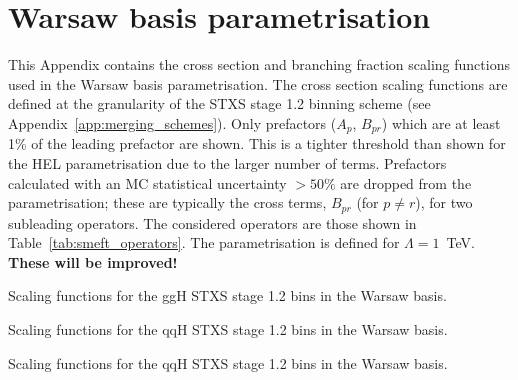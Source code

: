 \chapter{Warsaw basis parametrisation}\label{app:smeft_parametrisation}

This Appendix contains the cross section and branching fraction scaling functions used in the Warsaw basis parametrisation. The cross section scaling functions are defined at the granularity of the STXS stage 1.2 binning scheme (see Appendix~\ref{app:merging_schemes}). Only prefactors ($A_p$, $B_{pr}$) which are at least 1\% of the leading prefactor are shown. This is a tighter threshold than shown for the HEL parametrisation due to the larger number of terms. Prefactors calculated with an MC statistical uncertainty $>50\%$ are dropped from the parametrisation; these are typically the cross terms, $B_{pr}$ (for $p \neq r$), for two subleading operators. The considered operators are those shown in Table~\ref{tab:smeft_operators}. The parametrisation is defined for $\Lambda = 1$~TeV. \textbf{These will be improved!} 

\begin{table}[htb!]
  \centering
  \scriptsize
  \renewcommand{\arraystretch}{1.5}
  \setlength{\tabcolsep}{6pt}
  \caption[Warsaw: Scaling functions for the ggH STXS stage 1.2 bins]
  {
    Scaling functions for the ggH STXS stage 1.2 bins in the Warsaw basis.
  }
  \label{tab:warsaw_parametrisation_a}
  \hspace*{-2cm}
  
  \hspace*{-2cm}
\end{table}

\begin{table}[htb!]
  \centering
  \tiny
  \renewcommand{\arraystretch}{2}
  \setlength{\tabcolsep}{6pt}
  \caption[Warsaw: Scaling functions for the qqH STXS stage 1.2 bins]
  {
    Scaling functions for the qqH STXS stage 1.2 bins in the Warsaw basis.
  }
  \label{tab:warsaw_parametrisation_b}
  \hspace*{-2cm}
  
  \hspace*{-2cm}
\end{table}

\begin{table}[htb!]
  \centering
  \tiny
  \renewcommand{\arraystretch}{2}
  \setlength{\tabcolsep}{6pt}
  \caption[Warsaw: Scaling functions for the qqH STXS stage 1.2 bins]
  {
    Scaling functions for the qqH STXS stage 1.2 bins in the Warsaw basis.
  }
  \label{tab:warsaw_parametrisation_c}
  \hspace*{-2cm}
  
  \hspace*{-2cm}
\end{table}


